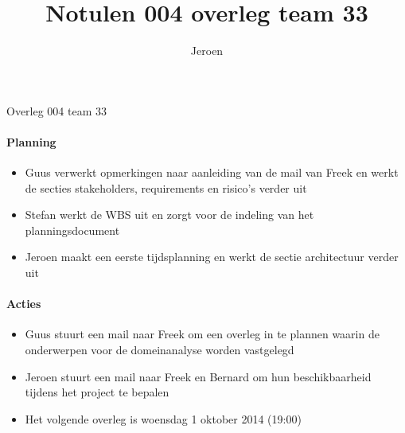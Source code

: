 \documentclass{article}
\title{Notulen 004 overleg team 33}
\author{Jeroen}
\begin{document}

\begin{Minutes}{Overleg 004 team 33}

\maketitle%


\paragraph{Planning}
\begin{itemize}
 \item Guus verwerkt opmerkingen naar aanleiding van de mail van Freek en werkt de secties stakeholders, requirements en risico's verder uit
 \item Stefan werkt de WBS uit en zorgt voor de indeling van het planningsdocument
 \item Jeroen maakt een eerste tijdsplanning en werkt de sectie architectuur verder uit
\end{itemize}

\paragraph{Acties}
\begin{itemize}
 \item Guus stuurt een mail naar Freek om een overleg in te plannen waarin de onderwerpen voor de domeinanalyse worden vastgelegd
 \item Jeroen stuurt een mail naar Freek en Bernard om hun beschikbaarheid tijdens het project te bepalen
 \item Het volgende overleg is woensdag 1 oktober 2014 (19:00)
\end{itemize}


\end{Minutes}
\end{document}
